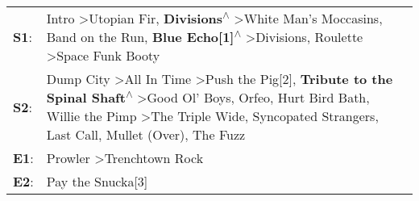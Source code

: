 \begin{supertabular}{p{0.03\textwidth}p{0.92\textwidth}}
 \textbf{S1}:  &                                                                                                                                                                         Intro\textsuperscript{} \textgreater \enspace Utopian Fir\textsuperscript{}, \enspace \textbf{Divisions\textsuperscript{$\wedge$}} \textgreater \enspace White Man's Moccasins\textsuperscript{}, \enspace Band on the Run\textsuperscript{}, \enspace \textbf{Blue Echo[1]\textsuperscript{$\wedge$}} \textgreater \enspace Divisions\textsuperscript{}, \enspace Roulette\textsuperscript{} \textgreater \enspace Space Funk Booty\textsuperscript{}  \enspace  \\
 \textbf{S2}:  &  Dump City\textsuperscript{} \textgreater \enspace All In Time\textsuperscript{} \textgreater \enspace Push the Pig[2]\textsuperscript{}, \enspace \textbf{Tribute to the Spinal Shaft\textsuperscript{$\wedge$}} \textgreater \enspace Good Ol' Boys\textsuperscript{}, \enspace Orfeo\textsuperscript{}, \enspace Hurt Bird Bath\textsuperscript{}, \enspace Willie the Pimp\textsuperscript{} \textgreater \enspace The Triple Wide\textsuperscript{}, \enspace Syncopated Strangers\textsuperscript{}, \enspace Last Call\textsuperscript{}, \enspace Mullet (Over)\textsuperscript{}, \enspace The Fuzz\textsuperscript{}  \enspace  \\
 \textbf{E1}:  &                                                                                                                                                                                                                                                                                                                                                                                                                                                                                                                                              Prowler\textsuperscript{} \textgreater \enspace Trenchtown Rock\textsuperscript{}  \enspace  \\
 \textbf{E2}:  &                                                                                                                                                                                                                                                                                                                                                                                                                                                                                                                                                                                            Pay the Snucka[3]\textsuperscript{}  \enspace  \\
\end{supertabular}
